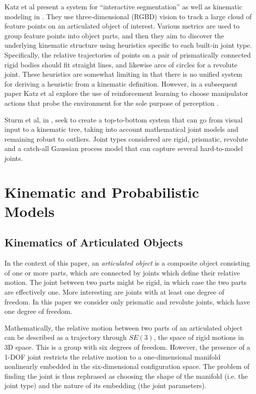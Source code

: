 \documentclass[a4paper,orivec]{llncs}
\begin{document}
Katz et al present a system for ``interactive segmentation'' as well as kinematic modeling in \cite{Katz2008}. They use three-dimensional (RGBD) vision to track a large cloud of feature points on an articulated object of interest. Various metrics are used to group feature points into object parts, and then they aim to discover the underlying kinematic structure using heuristics specific to each built-in joint type. Specifically, the relative trajectories of points on a pair of prismatically connected rigid bodies should fit straight lines, and likewise arcs of circles for a revolute joint. These heuristics are somewhat limiting in that there is no unified system for deriving a heuristic from a kinematic definition. However, in a subsequent paper Katz et al explore the use of reinforcement learning to choose manipulator actions that probe the environment for the sole purpose of perception \cite{Katz2008a}.

Sturm et al, in \cite{Sturm2011}, seek to create a top-to-bottom system that can go from visual input to a kinematic tree, taking into account mathematical joint models and remaining robust to outliers. Joint types considered are rigid, prismatic, revolute and a catch-all Gaussian process model that can capture several hard-to-model joints.

\section{Kinematic and Probabilistic Models} \label{sec:models}

\subsection{Kinematics of Articulated Objects}
In the context of this paper, an \emph{articulated object} is a composite object consisting of one or more parts, which are connected by joints which define their relative motion. The joint between two parts might be rigid, in which case the two parts are effectively one. More interesting are joints with at least one degree of freedom. In this paper we consider only prismatic and revolute joints, which have one degree of freedom.

Mathematically, the relative motion between two parts of an articulated object can be described as a trajectory through $SE(3)$, the space of rigid motions in 3D space. This is a group with six degrees of freedom. However, the presence of a 1-DOF joint restricts the relative motion to a one-dimensional manifold nonlinearly embedded in the six-dimensional configuration space. The problem of finding the joint is thus rephrased as choosing the shape of the manifold (i.e. the joint type) and the nature of its embedding (the joint parameters).
\end{document}
